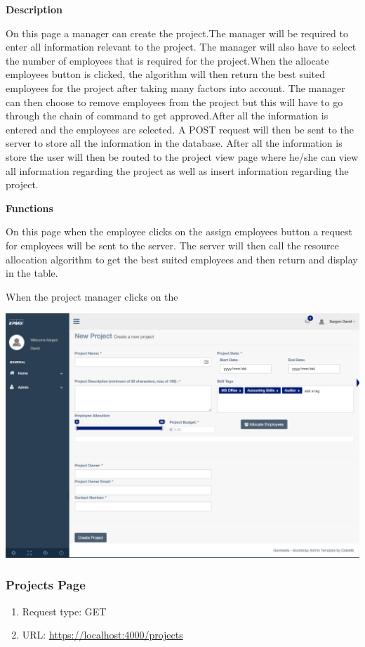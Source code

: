 \documentclass[a4paper,12pt]{article}
\begin{document}
				\textbf{Description}
				\begin{flushleft}
					On this page a manager can create the project.The manager will be required to enter all information relevant to the project. The manager will also have to select the number of employees that is required for the project.When the allocate employees button is clicked, the algorithm will then return the best suited employees for the project after taking many factors into account. The manager can then choose to remove employees from the project but this will have to go through the chain of command to get approved.After all the information is entered and the employees are selected. A POST request will then be sent to the server to store all the information in the database. After all the information is store the user will then be routed to the project view page where he/she can view all information regarding the project as well as insert information regarding the project.
				\end{flushleft}
			
			\textbf{Functions}
			\begin{flushleft}
				On this page when the employee clicks on the assign employees button a request for employees will be sent to the server. The server will then call the resource allocation algorithm to get the best suited employees and then return and display in the table.
				
				When the project manager clicks on the  
			\end{flushleft}
			\includegraphics[width=0.99\linewidth]{Images/manager_create_project.png}
	  
			
		\subsubsection{Projects Page}
		 		\begin{enumerate}
				 	\item Request type: GET
				 	\item URL: \url{https://localhost:4000/projects}
				 \end{enumerate}
				
\end{document}
